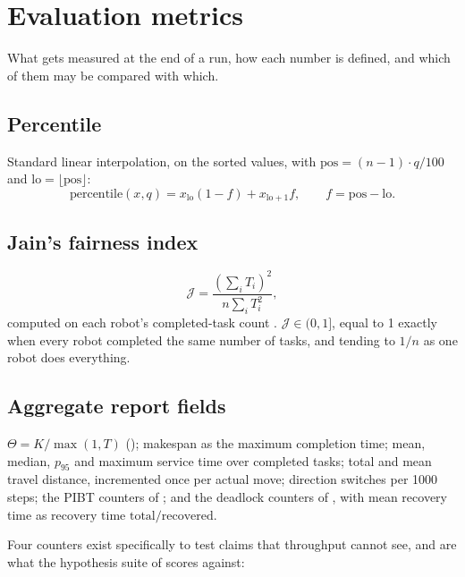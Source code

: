 \section{Evaluation metrics}
\label{sec:metrics}

\begin{lede}
What gets measured at the end of a run, how each number is defined, and which
of them may be compared with which.
\end{lede}

\subsection{Percentile}

Standard linear interpolation, on the sorted values, with
$\mathrm{pos} = (n-1) \cdot q/100$ and $\mathrm{lo} = \lfloor \mathrm{pos} \rfloor$:
\begin{equation}
  \mathrm{percentile}(x, q)
    = x_{\mathrm{lo}} (1 - f) + x_{\mathrm{lo}+1} f,
  \qquad f = \mathrm{pos} - \mathrm{lo}.
\end{equation}

\subsection{Jain's fairness index}

\begin{equation}
  \mathcal{J} = \frac{\left(\sum_i T_i\right)^2}{n \sum_i T_i^2},
  \label{eq:jain}
\end{equation}
computed on each robot's completed-task count \citep{jain1984fairness}.
$\mathcal{J} \in (0, 1]$, equal to 1 exactly when every robot completed the
same number of tasks, and tending to $1/n$ as one robot does everything.

\subsection{Aggregate report fields}

$\Theta = K / \max(1, T)$ (); makespan as the maximum
completion time; mean, median, $p_{95}$ and maximum service time over completed
tasks; total and mean travel distance, incremented once per actual move;
direction switches per 1000 steps; the PIBT counters of
; and the deadlock counters of
, with mean recovery time as
$\text{recovery time total} / \text{recovered}$.

Four counters exist specifically to test claims that throughput cannot see, and
are what the hypothesis suite of  scores against:


